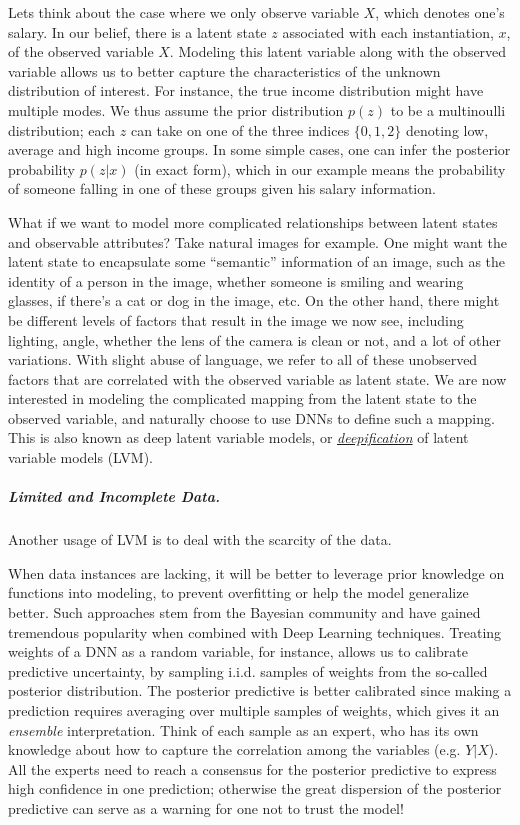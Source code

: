 \documentclass{article}
\begin{document}
Lets think about the case where we only observe variable $X$, which denotes one's salary. 
In our belief, there is a latent state $z$ associated with each instantiation, $x$, of the observed variable $X$.
Modeling this latent variable along with the observed variable allows us to better capture the characteristics of the unknown distribution of interest. 
For instance, the true income distribution might have multiple modes. 
We thus assume the prior distribution $p(z)$ to be a multinoulli distribution; each $z$ can take on one of the three indices $\{0,1,2\}$ denoting low, average and high income groups. 
In some simple cases, one can infer the posterior probability $p(z|x)$ (in exact form), which in our example means the probability of someone falling in one of these groups given his salary information.

What if we want to model more complicated relationships between latent states and observable attributes? 
Take natural images for example. 
One might want the latent state to encapsulate some ``semantic'' information of an image, such as the identity of a person in the image, whether someone is smiling and wearing glasses, if there's a cat or dog in the image, etc. 
On the other hand, there might be different levels of factors that result in the image we now see, including lighting, angle, whether the lens of the camera is clean or not, and a lot of other variations. 
With slight abuse of language, we refer to all of these unobserved factors that are correlated with the observed variable as latent state. 
We are now interested in modeling the complicated mapping from the latent state to the observed variable, and naturally choose to use DNNs to define such a mapping.
This is also known as deep latent variable models, or \href{http://videolectures.net/deeplearning2017_welling_inference/}{\emph{deepification}} of latent variable models (LVM).

\subparagraph{Limited and Incomplete Data.} 
Another usage of LVM is to deal with the scarcity of the data. 

When data instances are lacking, it will be better to leverage prior knowledge on functions into modeling, to prevent overfitting or help the model generalize better. 
Such approaches stem from the Bayesian community and have gained tremendous popularity when combined with Deep Learning techniques. %
Treating weights of a DNN as a random variable, for instance, allows us to calibrate predictive uncertainty, by sampling i.i.d. samples of weights from the so-called posterior distribution. 
The posterior predictive is better calibrated since making a prediction requires averaging over multiple samples of weights, which gives it an \textit{ensemble} interpretation. 
Think of each sample as an expert, who has its own knowledge about how to capture the correlation among the variables (e.g. $Y|X$). 
All the experts need to reach a consensus for the posterior predictive to express high confidence in one prediction; otherwise the great dispersion of the posterior predictive can serve as a warning for one not to trust the model!
\end{document}
